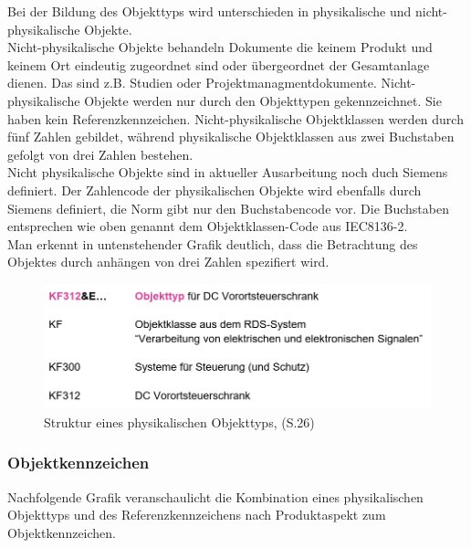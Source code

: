 Bei der Bildung des Objekttyps wird unterschieden in physikalische und nicht-physikalische Objekte. \\
Nicht-physikalische Objekte behandeln Dokumente die keinem Produkt und keinem Ort eindeutig zugeordnet sind oder übergeordnet der Gesamtanlage dienen. Das sind z.B. Studien oder Projektmanagmentdokumente. Nicht-physikalische Objekte werden nur durch den Objekttypen gekennzeichnet. Sie haben kein Referenzkennzeichen. Nicht-physikalische Objektklassen werden durch fünf Zahlen gebildet, während physikalische Objektklassen aus zwei Buchstaben gefolgt von drei Zahlen bestehen.\\
Nicht physikalische Objekte sind in aktueller Ausarbeitung noch duch Siemens definiert. Der Zahlencode der physikalischen Objekte wird ebenfalls durch Siemens definiert, die Norm gibt nur den Buchstabencode vor.
Die Buchstaben entsprechen wie oben genannt dem Objektklassen-Code aus IEC8136-2.\\
Man erkennt in untenstehender Grafik deutlich, dass die Betrachtung des Objektes durch anhängen von drei Zahlen spezifiert wird.\\
\begin{figure}[H]
   \begin{center}
   \includegraphics[width=1\textwidth]{Bilder/objekttyp} 
   \caption{Struktur eines physikalischen Objekttyps, \cite{5}(S.26)} 
   \label{fig:objekttyp} 
   \end{center}
\end{figure}
\newpage
\subsubsection{Objektkennzeichen}
Nachfolgende Grafik veranschaulicht die Kombination eines physikalischen Objekttyps und des Referenzkennzeichens nach Produktaspekt zum Objektkennzeichen.
\newpage
%
